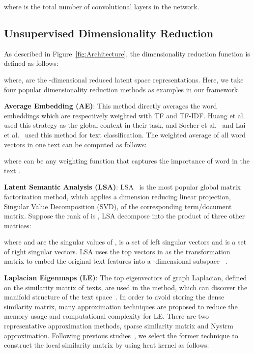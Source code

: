\documentclass[review]{elsarticle}
\begin{document}
where  is the total number of convolutional layers in the network.

\subsection{Unsupervised Dimensionality Reduction}
\label{sec:Unsupervised}
As described in Figure~\ref{fig:Architecture}, the dimensionality reduction function is defined as follows:

where,  are the -dimensional reduced latent space representations. Here, we take four popular dimensionality reduction methods as examples in our framework.

{\bf{Average Embedding (AE)}}: This method directly averages the word embeddings which are respectively weighted with TF and TF-IDF. Huang et al.~\cite{13_huang2012improving} used this strategy as the global context in their task, and Socher et al.~\cite{35_socher2013recursive} and Lai et al.~\cite{14_lai2015rcnn} used this method for text classification. The weighted average of all word vectors in one text can be computed as follows:


where  can be any weighting function that captures the importance of word  in the text .

{\bf{Latent Semantic Analysis (LSA)}}: LSA~\cite{deerwester1990indexing} is the most popular global matrix factorization method, which applies a dimension reducing linear projection, Singular Value Decomposition (SVD), of the corresponding term/document matrix. Suppose the rank of  is , LSA decompose  into the product of three other matrices:


where  and  are the singular values of ,  is a set of left singular vectors and  is a set of right singular vectors. LSA uses the top  vectors in  as the transformation matrix to embed the original text features into a -dimensional subspace ~\cite{deerwester1990indexing}.

{\bf{Laplacian Eigenmaps (LE)}}: The top eigenvectors of graph Laplacian, defined on the similarity matrix of texts, are used in the method, which can discover the manifold structure of the text space~\cite{37_ng2002spectral}. In order to avoid storing the dense similarity matrix, many approximation techniques are proposed to reduce the memory usage and computational complexity for LE. There are two representative approximation methods, sparse similarity matrix and Nystrm approximation. Following previous studies~\cite{4_cai2005document,28_zhang2010self}, we select the former technique to construct the  local similarity matrix  by using heat kernel as follows:
\end{document}
